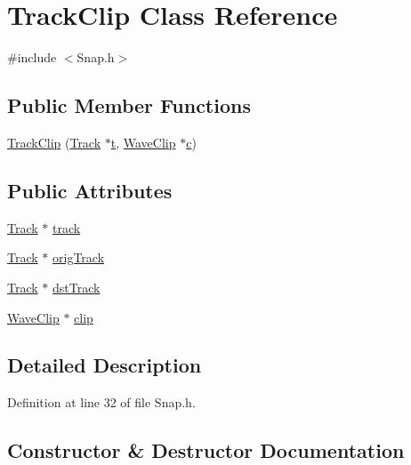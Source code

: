 \hypertarget{class_track_clip}{}\section{Track\+Clip Class Reference}
\label{class_track_clip}


{\ttfamily \#include $<$Snap.\+h$>$}

\subsection*{Public Member Functions}
\begin{DoxyCompactItemize}
\item 
\hyperlink{class_track_clip_a98d5c54a842a4d328eccdaada8ae0f28}{Track\+Clip} (\hyperlink{class_track}{Track} $\ast$\hyperlink{octave__test_8m_aaccc9105df5383111407fd5b41255e23}{t}, \hyperlink{class_wave_clip}{Wave\+Clip} $\ast$\hyperlink{rfft2d_test_m_l_8m_ae0323a9039add2978bf5b49550572c7c}{c})
\end{DoxyCompactItemize}
\subsection*{Public Attributes}
\begin{DoxyCompactItemize}
\item 
\hyperlink{class_track}{Track} $\ast$ \hyperlink{class_track_clip_a3539d37f715d74f8400bbede3be13c6a}{track}
\item 
\hyperlink{class_track}{Track} $\ast$ \hyperlink{class_track_clip_ace9065ae4c6576cc7d93346d6fa9718a}{orig\+Track}
\item 
\hyperlink{class_track}{Track} $\ast$ \hyperlink{class_track_clip_a0039c193ffc00858abbe6a34eb77eb5f}{dst\+Track}
\item 
\hyperlink{class_wave_clip}{Wave\+Clip} $\ast$ \hyperlink{class_track_clip_aa182c2e271beb63aac6cd8c63cd0f3b5}{clip}
\end{DoxyCompactItemize}


\subsection{Detailed Description}


Definition at line 32 of file Snap.\+h.



\subsection{Constructor \& Destructor Documentation}
